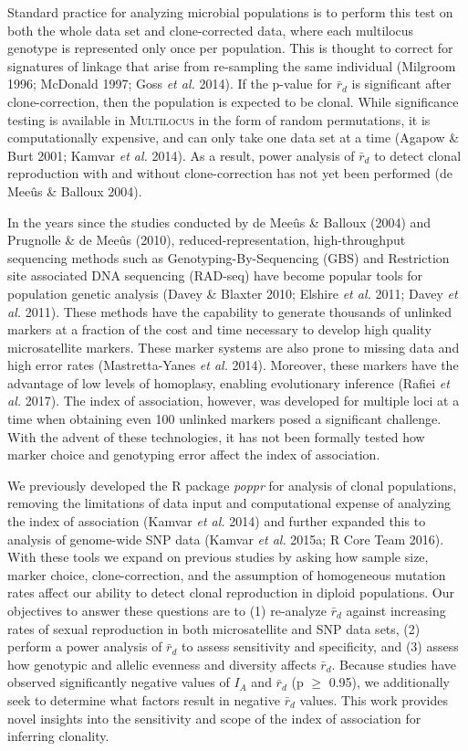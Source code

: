 \documentclass[]{article}
\theoremstyle{definition}
\theoremstyle{definition}
\theoremstyle{definition}
\theoremstyle{remark}
\begin{document}
Standard practice for analyzing microbial populations is to perform this
test on both the whole data set and clone-corrected data, where each
multilocus genotype is represented only once per population. This is
thought to correct for signatures of linkage that arise from re-sampling
the same individual (Milgroom 1996; McDonald 1997; Goss \emph{et al.}
2014). If the p-value for \(\bar{r}_d\) is significant after
clone-correction, then the population is expected to be clonal. While
significance testing is available in \textsc{Multilocus} in the form of
random permutations, it is computationally expensive, and can only take
one data set at a time (Agapow \& Burt 2001; Kamvar \emph{et al.} 2014).
As a result, power analysis of \(\bar{r}_d\) to detect clonal
reproduction with and without clone-correction has not yet been
performed (de Meeûs \& Balloux 2004).

In the years since the studies conducted by de Meeûs \& Balloux (2004)
and Prugnolle \& de Meeûs (2010), reduced-representation,
high-throughput sequencing methods such as Genotyping-By-Sequencing
(GBS) and Restriction site associated DNA sequencing (RAD-seq) have
become popular tools for population genetic analysis (Davey \& Blaxter
2010; Elshire \emph{et al.} 2011; Davey \emph{et al.} 2011). These
methods have the capability to generate thousands of unlinked markers at
a fraction of the cost and time necessary to develop high quality
microsatellite markers. These marker systems are also prone to missing
data and high error rates (Mastretta-Yanes \emph{et al.} 2014).
Moreover, these markers have the advantage of low levels of homoplasy,
enabling evolutionary inference (Rafiei \emph{et al.} 2017). The index
of association, however, was developed for multiple loci at a time when
obtaining even 100 unlinked markers posed a significant challenge. With
the advent of these technologies, it has not been formally tested how
marker choice and genotyping error affect the index of association.

We previously developed the R package \emph{poppr} for analysis of
clonal populations, removing the limitations of data input and
computational expense of analyzing the index of association (Kamvar
\emph{et al.} 2014) and further expanded this to analysis of genome-wide
SNP data (Kamvar \emph{et al.} 2015a; R Core Team 2016). With these
tools we expand on previous studies by asking how sample size, marker
choice, clone-correction, and the assumption of homogeneous mutation
rates affect our ability to detect clonal reproduction in diploid
populations. Our objectives to answer these questions are to (1)
re-analyze \(\bar{r}_d\) against increasing rates of sexual reproduction
in both microsatellite and SNP data sets, (2) perform a power analysis
of \(\bar{r}_d\) to assess sensitivity and specificity, and (3) assess
how genotypic and allelic evenness and diversity affects \(\bar{r}_d\).
Because studies have observed significantly negative values of \(I_A\)
and \(\bar{r}_d\) (p \(\geq\) 0.95), we additionally seek to determine
what factors result in negative \(\bar{r}_d\) values. This work provides
novel insights into the sensitivity and scope of the index of
association for inferring clonality.
\end{document}
